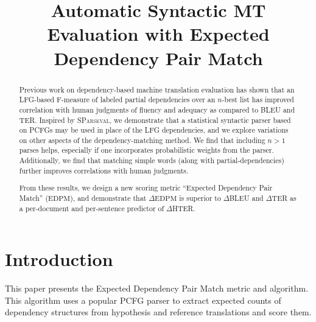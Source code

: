 \documentclass[11pt]{article}
\title{Automatic Syntactic MT Evaluation with Expected Dependency
  Pair Match}
\author{\blindthis{
    Jeremy G. Kahn \and Mari Ostendorf \\
    Signal, Speech \& Lang.\ Interpretation Lab\\
    University of Washington,
    Seattle, WA\\
    {\tt \{jgk,mo\}@ssli.ee.washington.edu}
    \And
    Brian Roark\\
    Ctr.\ for Spoken Lang.\ Understanding \\
    OHSU, Portland, OR\\
    {\tt roark@cslu.ogi.edu}
  }
}
\date{}
\newcommand{\myEDPM}[0]{\ensuremath{\mathrm{EDPM}}}
\begin{document}
\maketitle
\begin{abstract}
  Previous work on dependency-based machine translation evaluation
  has shown that an LFG-based F-measure of labeled partial
  dependencies over an $n$-best list %
  has improved correlation with human judgments of fluency and
  adequacy as compared to BLEU %
  and TER. %
  Inspired by \textsc{SParseval}, %
  we demonstrate that a statistical syntactic parser based on PCFGs
  may be used in place of the LFG dependencies, and we explore
  variations on other aspects of the %
  dependency-matching method. 
  We find 
  that including $n>1$ parses helps, especially if one incorporates
  probabilistic weights from the parser.  Additionally, we find that
  matching simple words (along with partial-dependencies) further improves
  correlations with human judgments. %

  From these results, we design a new scoring metric ``Expected
  Dependency Pair Match'' (\myEDPM), and 
  demonstrate that $\Delta$\myEDPM{} is superior to $\Delta$BLEU and
  $\Delta$TER as a per-document and per-sentence predictor of
  $\Delta$HTER.
\end{abstract}

\section*{Introduction}
This paper presents the Expected Dependency Pair Match metric and
algorithm.  This algorithm uses a popular PCFG parser to extract
expected counts of dependency structures from hypothesis and reference
translations and score them.

\end{document}
